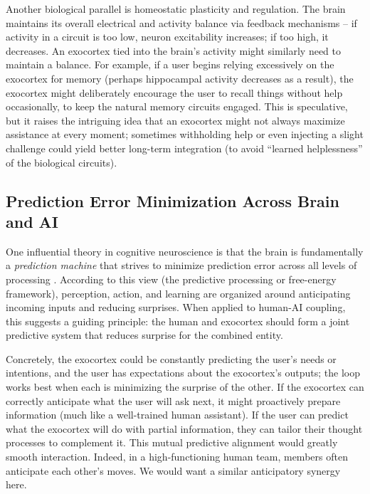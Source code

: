 \documentclass[11pt]{article}
\newcommand{\quotes}[1]{``#1''}
\begin{document}
Another biological parallel is homeostatic plasticity and regulation. The brain maintains its overall electrical and activity balance via feedback mechanisms -- if activity in a circuit is too low, neuron excitability increases; if too high, it decreases. An exocortex tied into the brain's activity might similarly need to maintain a balance. For example, if a user begins relying excessively on the exocortex for memory (perhaps hippocampal activity decreases as a result), the exocortex might deliberately encourage the user to recall things without help occasionally, to keep the natural memory circuits engaged. This is speculative, but it raises the intriguing idea that an exocortex might not always maximize assistance at every moment; sometimes withholding help or even injecting a slight challenge could yield better long-term integration (to avoid \quotes{learned helplessness} of the biological circuits).

\subsection{Prediction Error Minimization Across Brain and AI}
One influential theory in cognitive neuroscience is that the brain is fundamentally a \textit{prediction machine} that strives to minimize prediction error across all levels of processing \cite{Friston2010}. According to this view (the predictive processing or free-energy framework), perception, action, and learning are organized around anticipating incoming inputs and reducing surprises. When applied to human-AI coupling, this suggests a guiding principle: the human and exocortex should form a joint predictive system that reduces surprise for the combined entity.

Concretely, the exocortex could be constantly predicting the user's needs or intentions, and the user has expectations about the exocortex's outputs; the loop works best when each is minimizing the surprise of the other. If the exocortex can correctly anticipate what the user will ask next, it might proactively prepare information (much like a well-trained human assistant). If the user can predict what the exocortex will do with partial information, they can tailor their thought processes to complement it. This mutual predictive alignment would greatly smooth interaction. Indeed, in a high-functioning human team, members often anticipate each other's moves. We would want a similar anticipatory synergy here.
\end{document}
